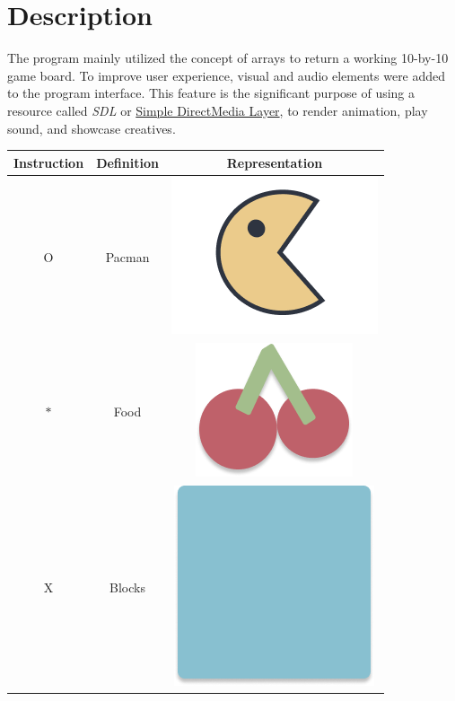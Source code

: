
\section{Description}

The program mainly utilized the concept of arrays to return a working 10-by-10
game board. To improve user experience, visual and audio elements were added to
the program interface. This feature is the significant purpose of using a
resource called \emph{SDL} or \href{https://www.libsdl.org/}{Simple DirectMedia Layer},
to render animation, play sound, and showcase creatives.

\begin{table}[H]
    \centering
    \def\arraystretch{2.5}
    \begin{tabular}{ c c c }
        \hline
        Instruction & Definition & Representation \\
        \hline
        O & Pacman & \includegraphics[scale=0.1]{assets/pacman_sample.png} \\
        $*$ & Food & \includegraphics[scale=0.1]{assets/food_sample.png} \\
        X & Blocks & \includegraphics[scale=0.1]{assets/block_sample.png} \\

\end{tabular}
\end{table}
